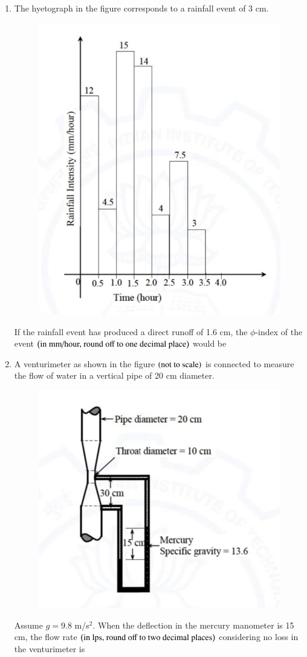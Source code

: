 \documentclass[journal,12pt,onecolumn]{article}
\theoremstyle{remark}
\begin{document}
\begin{enumerate}
\hfill{}

\item The hyetograph in the figure  corresponds to a rainfall event of 3 cm.
\begin{figure}[H]
    \centering
    \includegraphics[width=0.7\columnwidth]{figs/2q48.jpg}
    \caption{}
    \label{fig:q48}
\end{figure}
If the rainfall event has produced a direct runoff of 1.6 cm, the $\phi$-index of the event $\left(\text{in mm/hour, round off to one decimal place}\right)$ would be \underline{\hspace{2cm}}

\hfill{}

\item A venturimeter as shown in the figure  $\left(\text{not to scale}\right)$ is connected to measure the flow of water in a vertical pipe of 20 cm diameter.
\begin{figure}[H]
    \centering
    \includegraphics[width=0.7\columnwidth]{figs/2q49.jpg}
    \caption{}
    \label{fig:q49}
\end{figure}
Assume $g = 9.8$ m/s$^2$. When the deflection in the mercury manometer is 15 cm, the flow rate $\left(\text{in lps, round off to two decimal places}\right)$ considering no loss in the venturimeter is \underline{\hspace{2cm}}


\end{enumerate}
\end{document}

